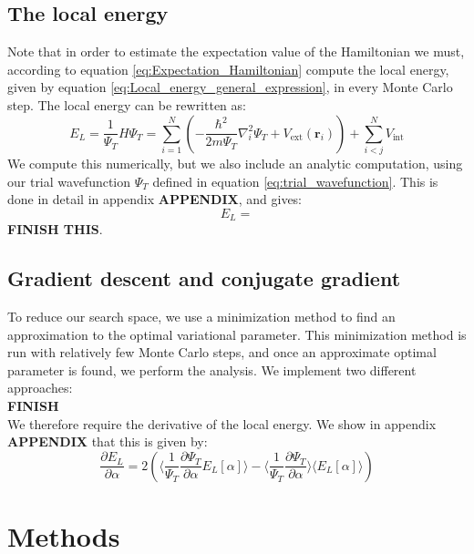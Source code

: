 \documentclass[a4paper, 10pt]{article}
\begin{document}
\subsection{The local energy}
Note that in  order to estimate the expectation value of the Hamiltonian we must, according to equation \ref{eq:Expectation_Hamiltonian} compute the local energy, given by equation \ref{eq:Local_energy_general_expression}, in every Monte Carlo step. The local energy can be rewritten as:
\begin{equation}
E_L=\frac{1}{\Psi_T}H\Psi_T =\sum_{i=1}^N\left(-\frac{\hbar^2}{2m\Psi_T}\nabla_i^2 \Psi_T+V_{\mathrm{ext}}(\boldsymbol{r}_i)\right)+\sum_{i<j}^N V_{\mathrm{int}}
\end{equation}
We compute this numerically, but we also include an analytic computation, using our trial wavefunction $\Psi_T$ defined in equation \ref{eq:trial_wavefunction}. This is done in detail in appendix \textbf{APPENDIX}, and gives:
\begin{equation}
E_L=
\end{equation}
\textbf{FINISH THIS}.



\subsection{Gradient descent and conjugate gradient}
To reduce our search space, we use a minimization method to find an approximation to the optimal variational parameter. This minimization method is run with relatively few Monte Carlo steps, and once an approximate optimal parameter is found, we perform the analysis. We implement two different approaches:\\
\textbf{FINISH}\\
We therefore require the derivative of the local energy. We show in appendix \textbf{APPENDIX} that this is given by:
\begin{equation}
\frac{\partial E_L}{\partial \alpha}=2\left(\big\langle \frac{1}{\Psi_T}\frac{\partial \Psi_T}{\partial \alpha}E_L[\alpha]\big\rangle-\big\langle \frac{1}{\Psi_T}\frac{\partial \Psi_T}{\partial \alpha}\big\rangle \big\langle E_L[\alpha]\big\rangle\right)
\end{equation}








\section{Methods}\label{Method_section}
\end{document}
